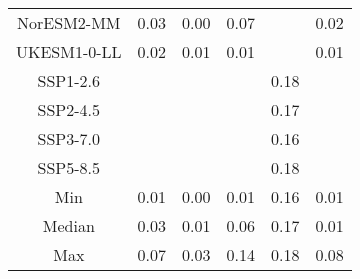 \begin{table*}[t]
\begin{tabular}{c|rrr|rr}
NorESM2-MM & 0.03 & 0.00 & 0.07 &  & 0.02 \\
UKESM1-0-LL & 0.02 & 0.01 & 0.01 &  & 0.01 \\
SSP1-2.6 &  &  &  & 0.18 &  \\
SSP2-4.5 &  &  &  & 0.17 &  \\
SSP3-7.0 &  &  &  & 0.16 &  \\
SSP5-8.5 &  &  &  & 0.18 &  \\
\midrule
Min & 0.01 & 0.00 & 0.01 & 0.16 & 0.01 \\
Median & 0.03 & 0.01 & 0.06 & 0.17 & 0.01 \\
Max & 0.07 & 0.03 & 0.14 & 0.18 & 0.08 \\
\bottomrule
\end{tabular}
\end{table*}
